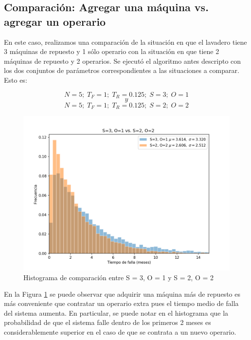   \pagebreak

  \subsection{Comparación: Agregar una máquina vs. agregar un operario}

  \par En este caso, realizamos una comparación de la situación en que el lavadero
  tiene 3 máquinas de repuesto y 1 sólo operario con la situación en que tiene 2
  máquinas de repuesto y 2 operarios.
  Se ejecutó el algoritmo antes descripto con los dos conjuntos de parámetros
  correspondientes a las situaciones a comparar. Esto es:

  \[
    N = 5; \; T_F = 1; \; T_R = 0.125; \; S = 3; \; O = 1
  \]
  \[y\]
  \[
    N = 5; \; T_F = 1; \; T_R = 0.125; \; S = 2; \; O = 2
  \]

  \begin{figure}[h]
      \centering
      \includegraphics[scale=0.8]{images/S3O1vsS2O2.png}
      \caption{Histograma de comparación entre S = 3, O = 1 y S = 2, O = 2}
      \label{fig:S3O1vsS2O2}
  \end{figure}
  \vspace{5mm}

  \par En la Figura \ref{fig:S3O1vsS2O2} se puede observar que adquirir una máquina más
  de repuesto es más conveniente
  que contratar un operario extra pues el tiempo medio de falla del sistema aumenta.
  En particular, se puede notar en el histograma que la probabilidad de que el sistema falle
  dentro de los primeros 2 meses es considerablemente superior en el caso de que
  se contrata a un nuevo operario.
